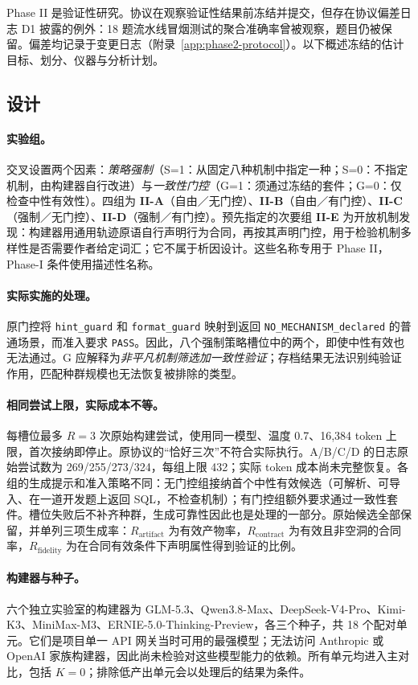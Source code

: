 Phase II 是验证性研究。协议在观察验证性结果前冻结并提交，但存在协议偏差日志 D1 披露的例外：18 题流水线冒烟测试的聚合准确率曾被观察，题目仍被保留。偏差均记录于变更日志（附录~\ref{app:phase2-protocol}）。以下概述冻结的估计目标、划分、仪器与分析计划。
\subsection{设计}\label{sec:p2design}
\paragraph{实验组。}交叉设置两个因素：\emph{策略强制}（S=1：从固定八种机制中指定一种；S=0：不指定机制，由构建器自行改进）与\emph{一致性门控}（G=1：须通过冻结的套件；G=0：仅检查中性有效性）。四组为 \textbf{II-A}（自由／无门控）、\textbf{II-B}（自由／有门控）、\textbf{II-C}（强制／无门控）、\textbf{II-D}（强制／有门控）。预先指定的次要组 \textbf{II-E} 为开放机制发现：构建器用通用轨迹原语自行声明行为合同，再按其声明门控，用于检验机制多样性是否需要作者给定词汇；它不属于析因设计。这些名称专用于 Phase II，Phase-I 条件使用描述性名称。
\paragraph{实际实施的处理。}原门控将 \texttt{hint\_guard} 和 \texttt{format\_guard} 映射到返回 \texttt{NO\_MECHANISM\_declared} 的普通场景，而准入要求 \texttt{PASS}。因此，八个强制策略槽位中的两个，即使中性有效也无法通过。G 应解释为\emph{非平凡机制筛选加一致性验证}；存档结果无法识别纯验证作用，匹配种群规模也无法恢复被排除的类型。
\paragraph{相同尝试上限，实际成本不等。}每槽位最多 $R=3$ 次原始构建尝试，使用同一模型、温度 0.7、16,384 token 上限，首次接纳即停止。原协议的“恰好三次”不符合实际执行。A/B/C/D 的日志原始尝试数为 269/255/273/324，每组上限 432；实际 token 成本尚未完整恢复。各组的生成提示和准入策略不同：无门控组接纳首个中性有效候选（可解析、可导入、在一道开发题上返回 SQL，不检查机制）；有门控组额外要求通过一致性套件。槽位失败后不补齐种群，生成可靠性因此也是处理的一部分。原始候选全部保留，并单列三项生成率：$R_{\mathrm{artifact}}$ 为有效产物率，$R_{\mathrm{contract}}$ 为有效且非空洞的合同率，$R_{\mathrm{fidelity}}$ 为在合同有效条件下声明属性得到验证的比例。
\paragraph{构建器与种子。}六个独立实验室的构建器为 GLM-5.3、Qwen3.8-Max、DeepSeek-V4-Pro、Kimi-K3、MiniMax-M3、ERNIE-5.0-Thinking-Preview，各三个种子，共 18 个配对单元。它们是项目单一 API 网关当时可用的最强模型；无法访问 Anthropic 或 OpenAI 家族构建器，因此尚未检验对这些模型能力的依赖。所有单元均进入主对比，包括 $K=0$；排除低产出单元会以处理后的结果为条件。
